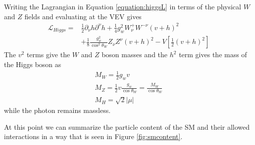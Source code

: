 Writing the Lagrangian in Equation \ref{equation:higgsL} in terms of the physical $W$ and $Z$ fields and evaluating at the VEV gives 
\begin{equation}
	\begin{split}
	\mathcal{L}_{Higgs} = &\frac{1}{2}\partial_\nu h\partial^\nu h + \frac{1}{4}g_w^2W_\nu^+W^{-\nu}(v+h)^2 \\
	& + \frac{1}{8}\frac{g_w^2}{\cos^2\theta_W}Z_\nu Z^\nu (v+h)^2 - V[\frac{1}{2}(v+h)^2]
	\end{split}
\end{equation}
The $v^2$ terms give the $W$ and $Z$ boson masses and the $h^2$ term gives the mass of the Higgs boson as
\begin{eqnarray}
	M_W = \frac{1}{2}g_wv \\
	M_Z = \frac{1}{2}v\frac{g_w}{\cos\theta_W} = \frac{M_W}{\cos\theta_W} \\
	M_H = \sqrt{2}|\mu|
\end{eqnarray}
while the photon remains massless.




At this point we can summarize the particle content of the SM and their allowed interactions in a way that is seen in Figure \ref{fig:smcontent}.

